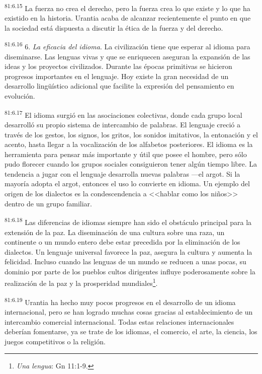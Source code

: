 \par
\textsuperscript{81:6.15} La fuerza no crea el derecho, pero la fuerza crea lo que existe y lo que ha existido en la historia. Urantia acaba de alcanzar recientemente el punto en que la sociedad está dispuesta a discutir la ética de la fuerza y del derecho.

\par
\textsuperscript{81:6.16} 6. \textit{La eficacia del idioma}. La civilización tiene que esperar al idioma para diseminarse. Las lenguas vivas y que se enriquecen aseguran la expansión de las ideas y los proyectos civilizados. Durante las épocas primitivas se hicieron progresos importantes en el lenguaje. Hoy existe la gran necesidad de un desarrollo ling\"uístico adicional que facilite la expresión del pensamiento en evolución.

\par
\textsuperscript{81:6.17} El idioma surgió en las asociaciones colectivas, donde cada grupo local desarrolló su propio sistema de intercambio de palabras. El lenguaje creció a través de los gestos, los signos, los gritos, los sonidos imitativos, la entonación y el acento, hasta llegar a la vocalización de los alfabetos posteriores. El idioma es la herramienta para pensar más importante y útil que posee el hombre, pero sólo pudo florecer cuando los grupos sociales consiguieron tener algún tiempo libre. La tendencia a jugar con el lenguaje desarrolla nuevas palabras ---el argot. Si la mayoría adopta el argot, entonces el uso lo convierte en idioma. Un ejemplo del origen de los dialectos es la condescendencia a <<hablar como los niños>> dentro de un grupo familiar.

\par
\textsuperscript{81:6.18} Las diferencias de idiomas siempre han sido el obstáculo principal para la extensión de la paz. La diseminación de una cultura sobre una raza, un continente o un mundo entero debe estar precedida por la eliminación de los dialectos. Un lenguaje universal favorece la paz, asegura la cultura y aumenta la felicidad. Incluso cuando las lenguas de un mundo se reducen a unas pocas, su dominio por parte de los pueblos cultos dirigentes influye poderosamente sobre la realización de la paz y la prosperidad mundiales\footnote{\textit{Una lengua}: Gn 11:1-9.}.

\par
\textsuperscript{81:6.19} Urantia ha hecho muy pocos progresos en el desarrollo de un idioma internacional, pero se han logrado muchas cosas gracias al establecimiento de un intercambio comercial internacional. Todas estas relaciones internacionales deberían fomentarse, ya se trate de los idiomas, el comercio, el arte, la ciencia, los juegos competitivos o la religión.

